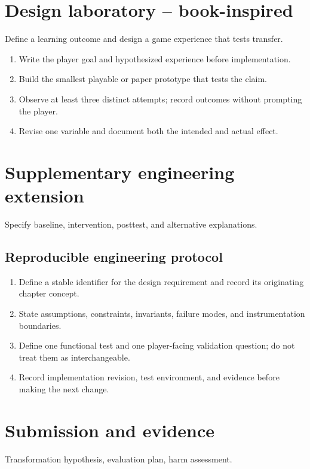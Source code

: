 \documentclass[11pt]{article}
\begin{document}
\section{Design laboratory -- book-inspired}
Define a learning outcome and design a game experience that tests transfer.

\begin{enumerate}
\item Write the player goal and hypothesized experience before implementation.
\item Build the smallest playable or paper prototype that tests the claim.
\item Observe at least three distinct attempts; record outcomes without prompting the player.
\item Revise one variable and document both the intended and actual effect.
\end{enumerate}

\section{Supplementary engineering extension}
Specify baseline, intervention, posttest, and alternative explanations.


\subsection{Reproducible engineering protocol}
\begin{enumerate}
\item Define a stable identifier for the design requirement and record its originating chapter concept.
\item State assumptions, constraints, invariants, failure modes, and instrumentation boundaries.
\item Define one functional test and one player-facing validation question; do not treat them as interchangeable.
\item Record implementation revision, test environment, and evidence before making the next change.
\end{enumerate}

\section{Submission and evidence}
Transformation hypothesis, evaluation plan, harm assessment.
\end{document}
